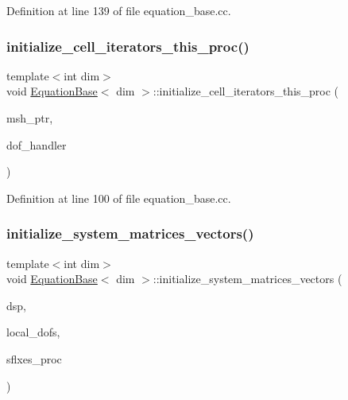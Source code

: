 Definition at line 139 of file equation\+\_\+base.\+cc.

\mbox{\label{class_equation_base_a4268bd83e1858fb6326c9b67851e85cc}} 
\subsubsection{\texorpdfstring{initialize\+\_\+cell\+\_\+iterators\+\_\+this\+\_\+proc()}{initialize\_cell\_iterators\_this\_proc()}}
{\footnotesize\ttfamily template$<$int dim$>$ \\
void \hyperlink{class_equation_base}{Equation\+Base}$<$ dim $>$\+::initialize\+\_\+cell\+\_\+iterators\+\_\+this\+\_\+proc (\begin{DoxyParamCaption}\item[{const std\+\_\+cxx11\+::shared\+\_\+ptr$<$ \hyperlink{class_mesh_generator}{Mesh\+Generator}$<$ dim $>$ $>$}]{msh\+\_\+ptr,  }\item[{const Do\+F\+Handler$<$ dim $>$ \&}]{dof\+\_\+handler }\end{DoxyParamCaption})}



Definition at line 100 of file equation\+\_\+base.\+cc.

\mbox{\label{class_equation_base_a25ff3b8e1a0c98dc5077e6afbac6606c}} 
\subsubsection{\texorpdfstring{initialize\+\_\+system\+\_\+matrices\+\_\+vectors()}{initialize\_system\_matrices\_vectors()}}
{\footnotesize\ttfamily template$<$int dim$>$ \\
void \hyperlink{class_equation_base}{Equation\+Base}$<$ dim $>$\+::initialize\+\_\+system\+\_\+matrices\+\_\+vectors (\begin{DoxyParamCaption}\item[{Dynamic\+Sparsity\+Pattern \&}]{dsp,  }\item[{Index\+Set \&}]{local\+\_\+dofs,  }\item[{std\+::vector$<$ Vector$<$ double $>$ $>$ \&}]{sflxes\+\_\+proc }\end{DoxyParamCaption})\hspace{0.3cm}{\ttfamily [virtual]}}

